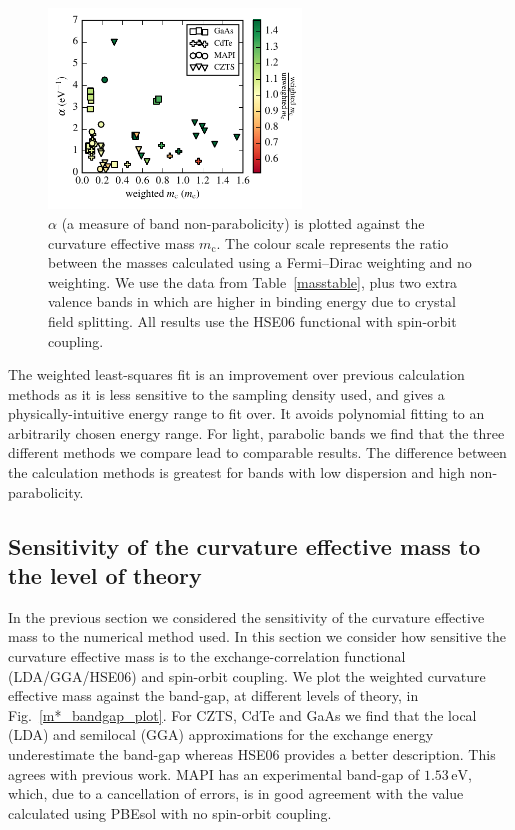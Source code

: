 \begin{figure}[tb]\centering
\includegraphics[width=0.6\textwidth]{./figures/ch4/mass_alpha_ratio.pdf}
\caption[Band non-parabolicity and effective mass]{\label{mass_alpha_ratio}$\alpha$ (a measure of band non-parabolicity) is plotted against the curvature effective mass $m_\text{c}$. The colour scale represents the ratio between the masses calculated using a Fermi--Dirac weighting and no weighting. We use the data from Table\ \ref{masstable}, plus two extra valence bands in  which are higher in binding energy due to crystal field splitting. All results use the HSE06 functional with spin-orbit coupling.} 
\end{figure}

The weighted least-squares fit is an improvement over previous calculation methods as it is less sensitive to the sampling density used, and gives a physically-intuitive energy range to fit over. 
It avoids polynomial fitting to an arbitrarily chosen energy range. 
For light, parabolic bands we find that the three different methods we compare lead to comparable results.
The difference between the calculation methods is greatest for bands with low dispersion and high non-parabolicity.

\subsection{Sensitivity of the curvature effective mass to the level of theory}

In the previous section we considered the sensitivity of the curvature effective mass to the numerical method used.
In this section we consider how sensitive the curvature effective mass is to the exchange-correlation functional (LDA/GGA/HSE06) and spin-orbit coupling.
We plot the weighted curvature effective mass against the band-gap, at different levels of theory, in Fig.\ \ref{m*_bandgap_plot}. 
For CZTS, CdTe and GaAs we find that the local (LDA) and semilocal (GGA) approximations for the exchange energy underestimate the band-gap whereas HSE06 provides a better description. This agrees with previous work.\autocite{Deak2010,Heyd2003}
MAPI has an experimental band-gap of $1.53\,\mathrm{eV}$,\autocite{Liu2015} which, due to a cancellation of errors, is in good agreement with the value calculated using PBEsol with no spin-orbit coupling. 

